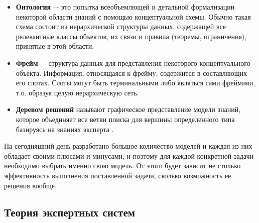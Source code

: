 \begin{itemize}
	\item \textbf{Онтология} –- это попытка всеобъемлющей и детальной формализации некоторой области знаний с помощью концептуальной схемы. Обычно такая схема состоит из иерархической структуры данных, содержащей все релевантные классы объектов, их связи и правила (теоремы, ограничения), принятые в этой области.
	
	\item \textbf{Фрейм} –- структура данных для представления некоторого концептуального объекта. Информация, относящаяся к фрейму, содержится в составляющих его слотах. Слоты могут быть терминальными либо являться сами фреймами, т.о. образуя целую иерархическую сеть.
	
	\item \textbf{Деревом решений} называют графическое представление модели знаний, которое объединяет все ветви поиска для вершины определенного типа базируясь на знаниях эксперта \cite{tree}.
\end{itemize}

На сегодняшний день разработано большое количество моделей и каждая из них обладает своими плюсами и минусами, и поэтому для каждой конкретной задачи необходимо выбрать именно свою модель. От этого будет зависит не столько эффективность выполнения поставленной задачи, сколько возможность ее решения вообще.

\subsection{Теория экспертных систем}


